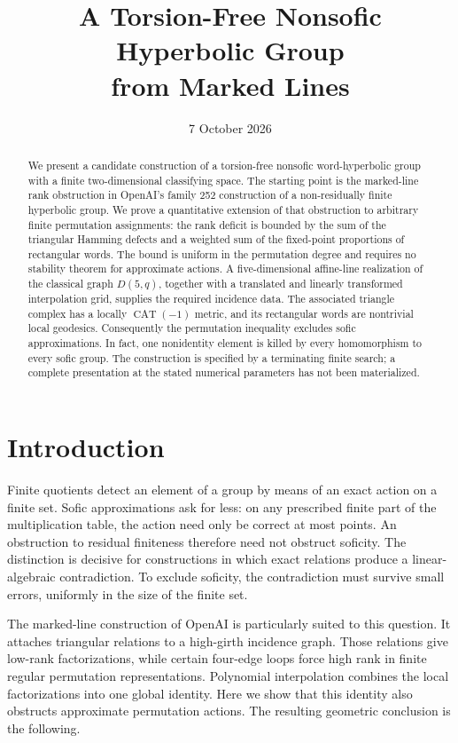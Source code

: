 \documentclass[11pt]{amsart}
\title[Marked lines and nonsofic hyperbolic groups]{A Torsion-Free Nonsofic Hyperbolic Group\texorpdfstring{\\}{} from Marked Lines}
\date{7 October 2026}
\theoremstyle{definition}
\theoremstyle{remark}
\numberwithin{equation}{section}
\newcommand{\CAT}{\operatorname{CAT}}
\begin{document}
\begin{abstract}
We present a candidate construction of a torsion-free nonsofic
word-hyperbolic group with a finite two-dimensional classifying space.
The starting point is the marked-line rank obstruction in OpenAI's
family 252 construction of a non-residually finite hyperbolic group.
We prove a quantitative extension of that obstruction to arbitrary
finite permutation assignments: the rank deficit is bounded by the
sum of the triangular Hamming defects and a weighted sum of the
fixed-point proportions of rectangular words. The bound is uniform
in the permutation degree and requires no stability theorem for
approximate actions. A five-dimensional affine-line realization of
the classical graph $D(5,q)$, together with a translated and linearly
transformed interpolation grid, supplies the required incidence data.
The associated triangle complex has a locally $\CAT(-1)$ metric, and
its rectangular words are nontrivial local geodesics. Consequently
the permutation inequality excludes sofic approximations. In fact,
one nonidentity element is killed by every homomorphism to every
sofic group. The construction is specified by a terminating finite
search; a complete presentation at the stated numerical parameters
has not been materialized.
\end{abstract}
\maketitle

\section{Introduction}

Finite quotients detect an element of a group by means of an exact
action on a finite set. Sofic approximations ask for less: on any
prescribed finite part of the multiplication table, the action need
only be correct at most points. An obstruction to residual finiteness
therefore need not obstruct soficity. The distinction is decisive for
constructions in which exact relations produce a linear-algebraic
contradiction. To exclude soficity, the contradiction must survive
small errors, uniformly in the size of the finite set.

The marked-line construction of OpenAI \cite{OA252} is particularly
suited to this question. It attaches triangular relations to a
high-girth incidence graph. Those relations give low-rank
factorizations, while certain four-edge loops force high rank in
finite regular permutation representations. Polynomial interpolation
combines the local factorizations into one global identity. Here we
show that this identity also obstructs approximate permutation
actions. The resulting geometric conclusion is the following.
\end{document}
